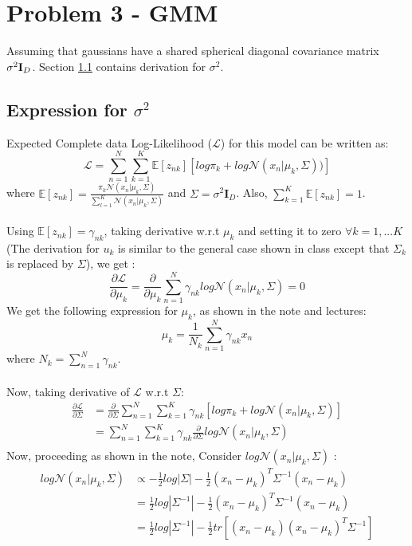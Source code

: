 \documentclass{article}
\begin{document}
\section{Problem 3 - GMM }
Assuming that gaussians have a shared spherical diagonal covariance matrix $\sigma^2\text{\textbf{I}}_D$.  Section \ref{sig} contains derivation for $\sigma^2$.
\subsection{Expression for $\sigma^2$}
\label{sig}
Expected Complete data Log-Likelihood ($\mathcal{L}$) for this model can be written as:
$$\mathcal{L} = \sum_{n=1}^N \sum_{k=1}^K \mathds{E}[z_{nk}][log\pi_k + log \mathcal{N}(x_n | \mu_k, \Sigma))]$$
where $\mathds{E}[z_{nk}] = \frac{\pi_k \mathcal{N}(x_n| \mu_k, \Sigma)}{\sum_{l=1}^K \mathcal{N}(x_n| \mu_k, \Sigma)}$ and $\Sigma = \sigma^2\textbf{I}_D$. Also, $\sum_{k=1}^K \mathds{E}[z_{nk}]=1$. \\ \\
Using $\mathds{E}[z_{nk}] = \gamma_{nk}$, taking derivative w.r.t $\mu_k$ and setting it to zero $\forall k = 1,...K $(The derivation for $u_k$ is similar to the general case shown in class except that $\Sigma_k$ is replaced by $\Sigma$), we get :
$$ \frac{\partial \mathcal{L}}{\partial \mu_k} = \frac{\partial}{\partial \mu_k} \sum_{n=1}^N \gamma_{nk} log \mathcal{N}(x_n | \mu_k, \Sigma) = 0 $$
We get the following expression for $\mu_k$, as shown in the note and lectures:
$$\mu_k = \frac{1}{N_k}\sum_{n=1}^N \gamma_{nk}x_n$$
where $N_k = \sum_{n=1}^N \gamma_{nk}$. \\ \\
Now, taking derivative of $\mathcal{L}$ w.r.t $\Sigma$:
\begin{equation*}
\begin{aligned}
\frac{\partial \mathcal{L}}{\partial \Sigma} &= \frac{\partial}{\partial \Sigma} \sum_{n=1}^N \sum_{k=1}^K \gamma_{nk}[ log \pi_k + log \mathcal{N}(x_n | \mu_k, \Sigma)] \\
&= \sum_{n=1}^N \sum_{k=1}^K \gamma_{nk} \frac{\partial}{\partial \Sigma} log \mathcal{N}(x_n | \mu_k, \Sigma) \\
\end{aligned}
\end{equation*}
Now, proceeding as shown in the note, Consider $log \mathcal{N}(x_n | \mu_k, \Sigma)$ :
\begin{equation*}
\begin{aligned}
log \mathcal{N}(x_n | \mu_k, \Sigma) &\propto - \frac{1}{2}log|\Sigma| - \frac{1}{2}(x_n- \mu_k)^T\Sigma^{-1}(x_n-\mu_k)\\
&= \frac{1}{2}log|\Sigma^{-1}| - \frac{1}{2}(x_n- \mu_k)^T\Sigma^{-1}(x_n-\mu_k) \\
&= \frac{1}{2}log|\Sigma^{-1}| - \frac{1}{2}tr[(x_n- \mu_k)(x_n-\mu_k)^T\Sigma^{-1} ]\\
\end{aligned}
\end{equation*}
\end{document}
